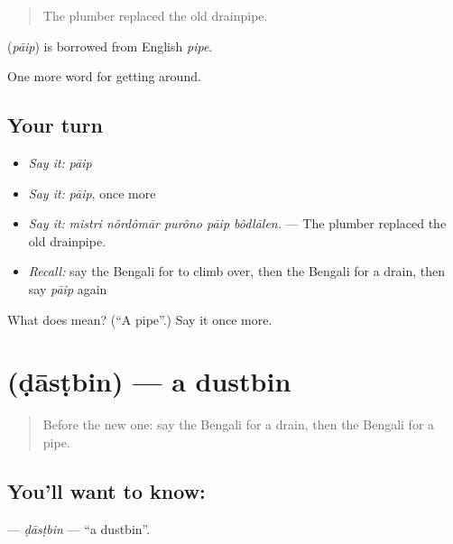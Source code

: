 \begin{quote}
The plumber replaced the old drainpipe.
\end{quote}

\begin{cousinweb}
\textbf{} (\emph{pāip}) is borrowed from English \emph{pipe}.
\end{cousinweb}

\begin{grammarlens}[title={What you've built}]
One more word for getting around.
\end{grammarlens}

\subsection*{Your turn}
\begin{itemize}
\raggedright
  \item \emph{Say it:} \emph{pāip}
  \item \emph{Say it:} \emph{pāip}, once more
  \item \emph{Say it:} \emph{mistri nôrdômār purôno pāip bôdlālen.} — The plumber replaced the old drainpipe.
  \item \emph{Recall:} say the Bengali for to climb over, then the Bengali for a drain, then say \emph{pāip} again
\end{itemize}

\begin{tcolorbox}[breakable,colback=teal!4,colframe=teal!35!black,title={Before you move on}]
What does  mean? (\textquotedblleft{}A pipe\textquotedblright{}.) Say it once more.
\end{tcolorbox}
\section[\texorpdfstring{\bn{ডাস্টবিন} (ḍāsṭbin)}{ডাস্টবিন (ḍāsṭbin)}]{ (ḍāsṭbin) — a dustbin}

\label{lesson:BN-C413-dastbin}



\begin{quote}
Before the new one: say the Bengali for a drain, then the Bengali for a pipe.
\end{quote}

\subsection*{You'll want to know: }
\textbf{} — \emph{ḍāsṭbin} — \textquotedblleft{}a dustbin\textquotedblright{}.

